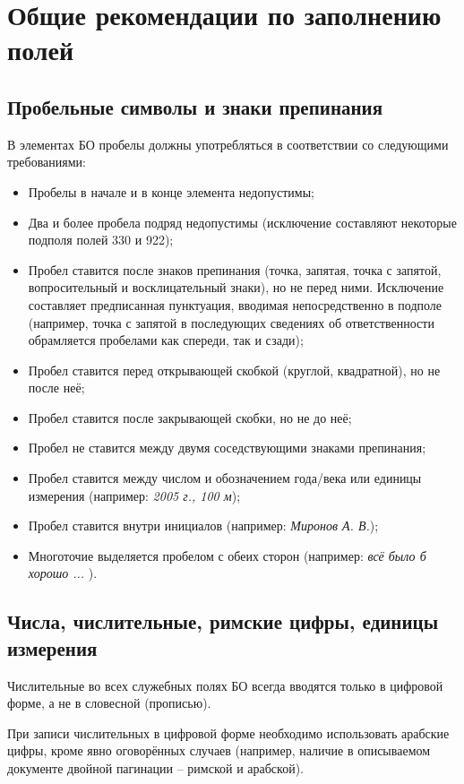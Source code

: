 \chapter*{Общие рекомендации по заполнению полей}

\section*{Пробельные символы и знаки препинания}

В элементах БО пробелы должны употребляться в соответствии со следующими требованиями:

\begin{itemize}
	\item Пробелы в начале и в конце элемента недопустимы;
	\item Два и более пробела подряд недопустимы (исключение составляют некоторые подполя полей 330 и 922);
	\item Пробел ставится после знаков препинания (точка, запятая, точка с запятой, вопросительный и восклицательный знаки), но не перед ними. Исключение составляет предписанная пунктуация, вводимая непосредственно в подполе (например, точка с запятой в последующих сведениях об ответственности обрамляется пробелами как спереди, так и сзади);
	\item Пробел ставится перед открывающей скобкой (круглой, квадратной), но не после неё;
	\item Пробел ставится после закрывающей скобки, но не до неё;
	\item Пробел не ставится между двумя соседствующими знаками препинания;
	\item Пробел ставится между числом и обозначением года/века или единицы измерения (например: \textit{2005 г., 100 м});
	\item Пробел ставится внутри инициалов (например: \textit{Миронов А. В.});
	\item Многоточие выделяется пробелом с обеих сторон (например: \textit{всё было б хорошо ... }).
\end{itemize}

\section*{Числа, числительные, римские цифры, единицы измерения}

Числительные во всех служебных полях БО всегда вводятся только в цифровой форме, а не в словесной (прописью).

При записи числительных в цифровой форме необходимо использовать арабские цифры, кроме явно оговорённых случаев (например, наличие в описываемом документе двойной пагинации -- римской и арабской).


